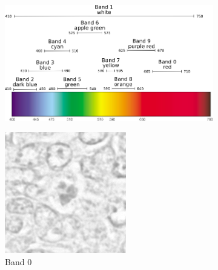 \documentclass[10pt,twocolumn,letterpaper]{article}
\begin{document}
\begin{figure}[t]
	\centering
	\begin{subfigure}[b]{0.5\textwidth}
		\centering
		\includegraphics[width=\textwidth]{img/spectral_bands.png}
	\end{subfigure}
	\begin{subfigure}[b]{0.11\textwidth}
		\centering
		\includegraphics[width=\textwidth]{img/M03_00a_0010_m1.png}
		\caption*{Band 0}
	\end{subfigure}
	\begin{subfigure}[b]{0.11\textwidth}
		\centering

\end{subfigure}
\end{figure}
\end{document}
